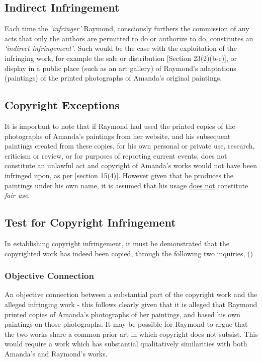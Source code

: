 \documentclass[11pt]{article}
\begin{document}
\subsection{Indirect Infringement}
\label{sec:org283e75c}

Each time the \emph{`infringer'} Raymond, consciously furthers the commission of any
acts that only the authors are permitted to do or authorize to do, constitutes
an \emph{`indirect infringement'}. Such would be the case with the exploitation of
the infringing work, for example the sale or distribution [Section
23(2)(b-c)]\cite{rsa78_copyrightact}, or display in a public place (such as an art
gallery) of Raymond's adaptations (paintings) of the
printed photographs of Amanda's original paintings.

\subsection{Copyright Exceptions}
\label{sec:orge32431e}
It is important to note that if Raymond had used the printed copies of the
photographs of Amanda's paintings from her website, and his subsequent paintings
created from these copies, for his own personal or private use, research,
criticism or review, or for purposes of reporting current events, does not
constitute an unlawful act and copyright of Amanda's works would not have been
infringed upon, as per [section 15(4)]\cite{rsa78_copyrightact}. However given
that he produces the paintings under his own name, it is assumed that his usage
\uline{does not} constitute \emph{fair use}.\\

\subsection{Test for Copyright Infringement}
\label{sec:orgab2b5c7}
In establishing copyright infringement, it must be demonstrated that the
copyrighted work has indeed been copied, through the following two inquiries,
() \cite{corbett89_galago_v_erasmus}
\subsubsection{Objective Connection}
\label{sec:orgf91362f}
An objective connection between a substantial part of the copyright work and the
alleged infringing work - this follows clearly given that it is alleged that
Raymond printed copies of Amanda's photographs of her paintings, and based his
own paintings on those photographs. It may be possible for Raymond to argue that
the two works share a common prior art in which copyright does not subsist. This
would require a work which has substantial qualitatively similarities with both
Amanda's and Raymond's works.
\end{document}
